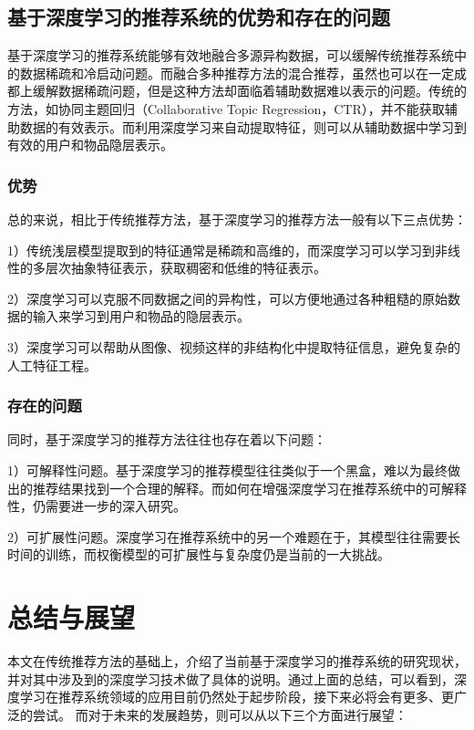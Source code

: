 \section{基于深度学习的推荐系统的优势和存在的问题}
基于深度学习的推荐系统能够有效地融合多源异构数据，可以缓解传统推荐系统中的数据稀疏和冷启动问题。而融合多种推荐方法的混合推荐，虽然也可以在一定成都上缓解数据稀疏问题，但是这种方法却面临着辅助数据难以表示的问题。传统的方法，如协同主题回归（Collaborative Topic Regression，CTR）\cite{WangB11CTM}，并不能获取辅助数据的有效表示\cite{WangWY15CDL}。而利用深度学习来自动提取特征，则可以从辅助数据中学习到有效的用户和物品隐层表示。
\subsection{优势}
总的来说，相比于传统推荐方法，基于深度学习的推荐方法一般有以下三点优势：

1）传统浅层模型提取到的特征通常是稀疏和高维的，而深度学习可以学习到非线性的多层次抽象特征表示，获取稠密和低维的特征表示\cite{ChengKHSCAACCIA16Wide&Deep}。

2）深度学习可以克服不同数据之间的异构性\cite{ZhangYLXM16CKBE}\cite{CovingtonAS16YouTube}，可以方便地通过各种粗糙的原始数据的输入来学习到用户和物品的隐层表示。

3）深度学习可以帮助从图像、视频这样的非结构化中提取特征信息，避免复杂的人工特征工程\cite{ZhangYLXM16CKBE}。
\subsection{存在的问题}
同时，基于深度学习的推荐方法往往也存在着以下问题：

1）可解释性问题。基于深度学习的推荐模型往往类似于一个黑盒，难以为最终做出的推荐结果找到一个合理的解释。而如何在增强深度学习在推荐系统中的可解释性，仍需要进一步的深入研究。

2）可扩展性问题。深度学习在推荐系统中的另一个难题在于，其模型往往需要长时间的训练，而权衡模型的可扩展性与复杂度仍是当前的一大挑战。



\chapter{总结与展望}
本文在传统推荐方法的基础上，介绍了当前基于深度学习的推荐系统的研究现状，并对其中涉及到的深度学习技术做了具体的说明。通过上面的总结，可以看到，深度学习在推荐系统领域的应用目前仍然处于起步阶段，接下来必将会有更多、更广泛的尝试\cite{ZhangYS17aaSurveyPerspect}。
而对于未来的发展趋势，则可以从以下三个方面进行展望：


